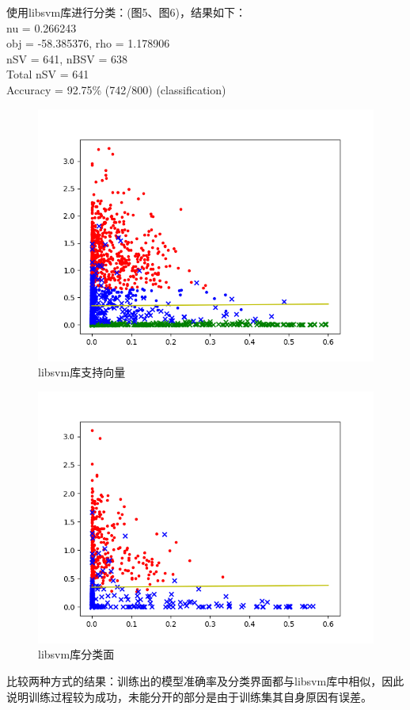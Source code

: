 \documentclass[a4paper]{article}
\begin{document}
使用libsvm库进行分类：(图5、图6)，结果如下：\\
nu = 0.266243 \\
obj = -58.385376, rho = 1.178906 \\
nSV = 641, nBSV = 638 \\
Total nSV = 641 \\
Accuracy = 92.75\% (742/800) (classification)\\
\begin{figure}
    \centering
    \includegraphics[width=12cm]{Fig_5.png}
    \caption{libsvm库支持向量}
\end{figure}
\begin{figure}
    \centering
    \includegraphics[width=12cm]{Fig_6.png}
    \caption{libsvm库分类面}
\end{figure}
比较两种方式的结果：训练出的模型准确率及分类界面都与libsvm库中相似，因此说明训练过程较为成功，未能分开的部分是由于训练集其自身原因有误差。
\end{document}
